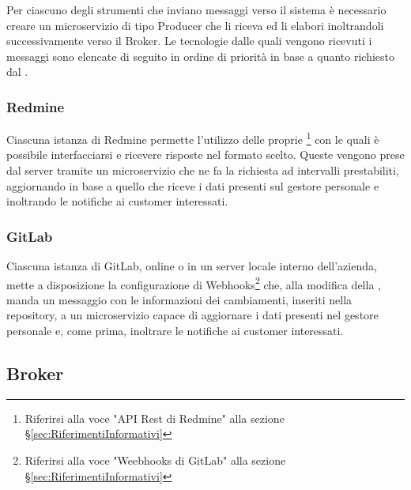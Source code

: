 		Per ciascuno degli strumenti che inviano messaggi verso il sistema è necessario creare un microservizio di tipo Producer che li riceva ed li elabori inoltrandoli successivamente verso il Broker.
		Le tecnologie dalle quali vengono ricevuti i messaggi sono elencate di seguito in ordine di priorità in base a quanto richiesto dal .

		\subsubsection{Redmine}
		Ciascuna istanza di Redmine permette l'utilizzo delle proprie \footnote{Riferirsi alla voce "API Rest di Redmine" alla sezione \S\ref{sec:RiferimentiInformativi}} con le quali è possibile interfacciarsi e ricevere risposte nel formato scelto.
		Queste vengono prese dal server tramite un microservizio che ne fa la richiesta ad intervalli prestabiliti, aggiornando in base a quello che riceve i dati presenti sul gestore personale e inoltrando le notifiche ai customer interessati.
		
		\subsubsection{GitLab}
		Ciascuna istanza di GitLab, online o in un server locale interno dell'azienda, mette a disposizione la configurazione di Webhooks\footnote{Riferirsi alla voce "Weebhooks di GitLab" alla sezione \S\ref{sec:RiferimentiInformativi}} che, alla modifica della , manda un messaggio con le informazioni dei cambiamenti, inseriti nella repository, a un microservizio capace di aggiornare i dati presenti nel gestore personale e, come prima, inoltrare le notifiche ai customer interessati.
		
		
	\subsection{Broker}
	
